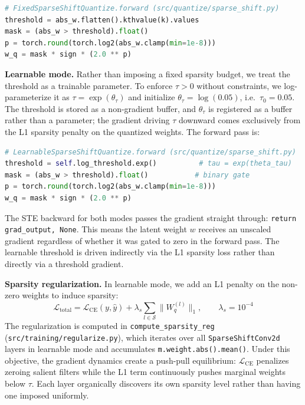 \documentclass[12pt]{article}
\begin{document}
\begin{lstlisting}[language=Python]
# FixedSparseShiftQuantize.forward (src/quantize/sparse_shift.py)
threshold = abs_w.flatten().kthvalue(k).values
mask = (abs_w > threshold).float()
p = torch.round(torch.log2(abs_w.clamp(min=1e-8)))
w_q = mask * sign * (2.0 ** p)
\end{lstlisting}

\textbf{Learnable mode.} Rather than imposing a fixed sparsity budget, we treat the threshold as a trainable parameter. To enforce $\tau > 0$ without constraints, we log-parameterize it as $\tau = \exp(\theta_\tau)$ and initialize $\theta_\tau = \log(0.05)$, i.e.\ $\tau_0 = 0.05$. The threshold is stored as a non-gradient buffer, and $\theta_\tau$ is registered as a buffer rather than a parameter; the gradient driving $\tau$ downward comes exclusively from the L1 sparsity penalty on the quantized weights. The forward pass is:

\begin{lstlisting}[language=Python]
# LearnableSparseShiftQuantize.forward (src/quantize/sparse_shift.py)
threshold = self.log_threshold.exp()          # tau = exp(theta_tau)
mask = (abs_w > threshold).float()           # binary gate
p = torch.round(torch.log2(abs_w.clamp(min=1e-8)))
w_q = mask * sign * (2.0 ** p)
\end{lstlisting}

The STE backward for both modes passes the gradient straight through: \texttt{return grad\_output, None}. This means the latent weight $w$ receives an unscaled gradient regardless of whether it was gated to zero in the forward pass. The learnable threshold is driven indirectly via the L1 sparsity loss rather than directly via a threshold gradient.

\textbf{Sparsity regularization.} In learnable mode, we add an L1 penalty on the non-zero weights to induce sparsity:
\begin{equation*}
    \mathcal{L}_\text{total} = \mathcal{L}_\text{CE}(y, \hat{y}) + \lambda_s \sum_{l \in \mathcal{S}} \|W_q^{(l)}\|_1, \qquad \lambda_s = 10^{-4}
\end{equation*}
The regularization is computed in \texttt{compute\_sparsity\_reg} (\texttt{src/training/regularize.py}), which iterates over all \texttt{SparseShiftConv2d} layers in learnable mode and accumulates \texttt{m.weight.abs().mean()}. Under this objective, the gradient dynamics create a push-pull equilibrium: $\mathcal{L}_\text{CE}$ penalizes zeroing salient filters while the L1 term continuously pushes marginal weights below $\tau$. Each layer organically discovers its own sparsity level rather than having one imposed uniformly.
\end{document}
